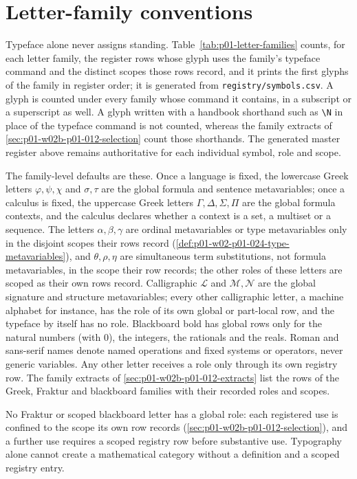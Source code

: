 \section{Letter-family conventions}
\label{sec:p01-letter-conventions}

Typeface alone never assigns standing.  Table~\ref{tab:p01-letter-families}
counts, for each letter family, the register rows whose glyph uses the
family's typeface command and the distinct scopes those rows record, and it
prints the first glyphs of the family in register order; it is generated
from \texttt{registry/symbols.csv}.  A glyph is counted under every family
whose command it contains, in a subscript or a superscript as well.  A
glyph written with a handbook shorthand such as \texttt{\textbackslash N}
in place of the typeface command is not counted, whereas the family
extracts of \cref{sec:p01-w02b-p01-012-selection} count those shorthands.
The generated master register above remains authoritative for each
individual symbol, role and scope.



The family-level defaults are these.  Once a language is fixed, the
lowercase Greek letters \(\varphi,\psi,\chi\) and \(\sigma,\tau\) are the
global formula and sentence metavariables; once a calculus is fixed, the
uppercase Greek letters \(\Gamma,\Delta,\Sigma,\Pi\) are the global formula
contexts, and the calculus declares whether a context is a set, a multiset
or a sequence.  The letters \(\alpha,\beta,\gamma\) are ordinal
metavariables or type metavariables only in the disjoint scopes their rows
record (\cref{def:p01-w02-p01-024-type-metavariables}), and
\(\theta,\rho,\eta\) are simultaneous term substitutions, not formula
metavariables, in the scope their row records; the other roles of these
letters are scoped as their own rows record.  Calligraphic \(\mathcal L\)
and \(\mathcal M,\mathcal N\) are the global signature and structure
metavariables; every other calligraphic letter, a machine alphabet for
instance, has the role of its own global or part-local row, and the
typeface by itself has no role.  Blackboard bold has global rows only for
the natural numbers (with \(0\)), the integers, the rationals and the
reals.  Roman and sans-serif names denote named operations and fixed
systems or operators, never generic variables.  Any other letter receives
a role only through its own registry row.  The family extracts of
\cref{sec:p01-w02b-p01-012-extracts} list the rows of the Greek, Fraktur
and blackboard families with their recorded roles and scopes.

No Fraktur or scoped blackboard letter has a global role: each registered
use is confined to the scope its own row records
(\cref{sec:p01-w02b-p01-012-selection}), and a further use requires a scoped
registry row before substantive use.  Typography alone cannot create a
mathematical category without a definition and a scoped registry entry.
